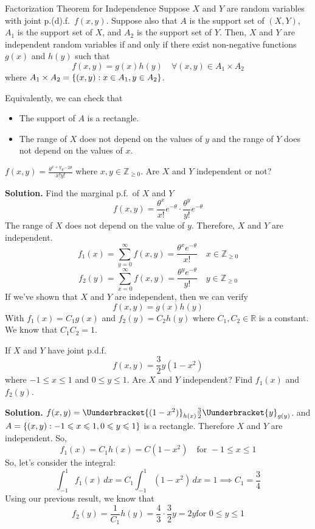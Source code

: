 \begin{Theorem}{Factorization Theorem for Independence}{}
    Suppose $ X $ and $ Y $ are random variables
    with joint p.(d).f.\ $ f(x,y) $. Suppose
    also that $ A $ is the support set of $ (X,Y) $,
    $ A_1 $ is the support set of $ X $,
    and $ A_2 $ is the support set of $ Y $. Then,
    $ X $ and $ Y $ are independent random variables
    if and only if there exist non-negative functions
    $ g(x) $ and $ h(y) $ such that
    \[ f(x,y)=g(x)h(y)\quad\forall(x,y)\in A_1\times A_2 \]
    where $ A_1\times A_2=\{(x,y):x\in A_1,y\in A_2\} $.
\end{Theorem}
\begin{Remark}{}{}
    Equivalently, we can check that
    \begin{itemize}
        \item The support of $ A $ is a rectangle.
        \item The range of $ X $ does not depend on the values
              of $ y $ and the range of $ Y $ does not depend on the values of $ x $.
    \end{itemize}
\end{Remark}

\begin{Example}{}{}
    $ \displaystyle f(x,y)=\frac{\theta^{x+y}e^{-2\theta}}{x!y!} $
    where $ x,y\in\mathbb{Z}_{\geqslant 0} $. Are $ X $ and $ Y $
    independent or not?

    \textbf{Solution.} Find the marginal p.f.\ of $ X $ and $ Y $
    \[ f(x,y)=\frac{\theta^x}{x!} e^{-\theta}\cdot \frac{\theta^y}{y!}e^{-\theta}  \]
    The range of $ X $ does not depend on the value of $ y $. Therefore,
    $ X $ and $ Y $ are independent.
    \[ f_1(x)=\sum\limits_{y=0}^{\infty} f(x,y)=\frac{\theta^x e^{-\theta}}{x!}\quad x\in
        \mathbb{Z}_{\geqslant 0} \]
    \[ f_2(y)=\sum\limits_{x=0}^{\infty} f(x,y)=\frac{\theta^y e^{-\theta}}{y!}\quad y\in
        \mathbb{Z}_{\geqslant 0} \]
    If we've shown that $ X $ and $ Y $ are independent, then we can verify
    \[ f(x,y)=g(x)h(y) \]
    With $ f_1(x)=C_1 g(x) $ and $ f_2(y)=C_2 h(y) $
    where $ C_1,C_2\in\mathbb{R} $ is a constant. We know that $ C_1C_2=1 $.
\end{Example}

\begin{Example}{}{}
    If $ X $ and $ Y $ have joint p.d.f.\
    \[ f(x,y)=\frac{3}{2} y(1-x^2) \]
    where $ -1\leqslant x\leqslant 1 $ and $ 0\leqslant y\leqslant 1 $.
    Are $ X $ and $ Y $ independent? Find $ f_1(x) $ and $ f_2(y) $.

    \textbf{Solution.}
    $ f(x,y)=\Uunderbracket{(1-x^2)}_{h(x)}\frac{3}{2} \Uunderbracket{y}_{g(y)} $.
    and $A =\{(x,y):-1\leqslant x\leqslant 1,0\leqslant y\leqslant 1\} $
    is a rectangle. Therefore $ X $ and $ Y $ are independent. So,
    \[ f_1(x)=C_1h(x)=C(1-x^2)\quad\text{for }-1\leqslant x\leqslant 1 \]
    So, let's consider the integral:
    \[ \int_{-1}^{1} f_1(x)\, d{x} =C_1
        \int_{-1}^{1} (1-x^2)\, d{x} =1
        \implies C_1=\frac{3}{4} \]
    Using our previous result, we know that
    \[ f_2(y)=\frac{1}{C_1} h(y)=\frac{4}{3}\cdot \frac{3}{2} y=2y
        \text{for }0\leqslant y\leqslant 1 \]
\end{Example}

